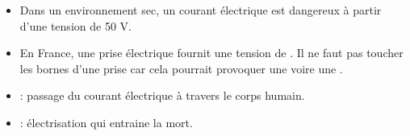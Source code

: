 \begin{mybilan}
	\begin{itemize}
		\item Dans un environnement sec, un courant électrique est dangereux à partir d'une tension de 50 V.\pause
		
		\item En France, une prise électrique fournit une tension de . Il ne faut pas toucher les bornes d'une prise car cela pourrait provoquer une  voire une .\pause
				 
	\end{itemize}

\end{mybilan}

\begin{mydefs}
	\begin{itemize}
		\item {} : passage du courant électrique à travers le corps humain. 
		
		\item {} : \'electrisation qui entraine la mort.
	\end{itemize}
\end{mydefs}